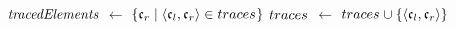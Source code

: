 \begin{algorithmic}[1]
        \State $\mathit{tracedElements}$ $\leftarrow$ $\{ \mathfrak{c}_{r} \mid \langle \mathfrak{c}_{l}, \mathfrak{c}_{r} \rangle \in traces_{} \}$
         \label{algo:synchronization:findcorrespondingelements:line:explicit}
                \State {}
            \EndIf
        \EndFor
         \label{algo:synchronization:findcorrespondingelements:line:implicit}
                \State $traces_{}$ $\leftarrow$ $traces_{} \cup \{ \langle \mathfrak{c}_{l},\mathfrak{c}_{r} \rangle \}$
                \State {}
            \EndIf 
        \EndFor
        \State \Return{$\bot$}
    \EndProcedure
\end{algorithmic}